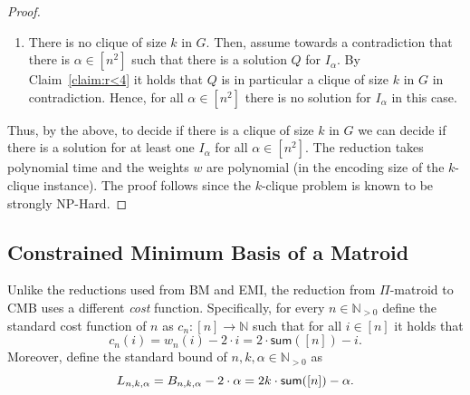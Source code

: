 {\begin{proof}
\begin{enumerate}
				\item  There is no clique of size $k$ in $G$. Then, assume towards a contradiction that there is $\alpha \in [n^2]$ such that there is a solution $Q$ for $I_{\alpha}$. By Claim~\ref{claim:r<4} it holds that $Q$ is in particular a clique of size $k$ in $G$ in contradiction. Hence, for all $\alpha \in [n^2]$ there is no solution for $I_{\alpha}$ in this case. 
			\end{enumerate} Thus, by the above, to decide if there is a clique of size $k$ in $G$ we can decide if there is a solution for at least one $I_{\alpha}$ for all $\alpha \in [n^2]$. The reduction takes polynomial time and the weights $w$ are polynomial (in the encoding size of the $k$-clique instance). The proof follows since the $k$-clique problem is known to be strongly NP-Hard.  		\end{proof}
		
		
	}
	
	
	\subsection{Constrained Minimum Basis of a Matroid}
	\label{sec:abs_CMB}
	
	
	Unlike the reductions used from  BM and EMI,  the reduction from $\Pi$-matroid to CMB uses a  different {\em cost} function. Specifically, for every $n \in \mathbb{N}_{>0}$ define the standard cost function of $n$ as $c_n:[n] \rightarrow \mathbb{N}$ such that for all $i \in [n]$ it holds that \begin{equation}
		\label{leq:w}
		c_n(i) = w_n(i)-2 \cdot i = 2 \cdot \textsf{sum}([n])-i.  
	\end{equation} Moreover, define the standard bound of  $n,k,\alpha \in \mathbb{N}_{>0}$  as \begin{equation}
		\label{leq:B}
		L_{n,k,\alpha} = B_{n,k,\alpha} -2 \cdot \alpha =2 k\cdot \textnormal{\textsf{sum}}([n])- \alpha.   
	\end{equation}
	
